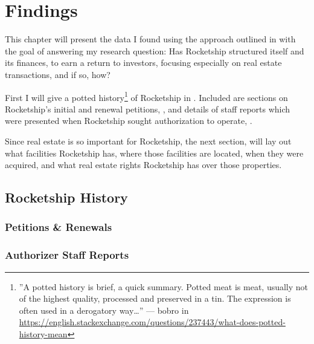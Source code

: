 
\chapter{Findings}\label{ch:findings}\noindent
\bigskip%

This chapter will present the data I found using the approach outlined in  with the goal of answering my research question: Has Rocketship structured itself and its finances, to earn a return to investors, focusing especially on real estate transactions, and if so, how?

First I will give a potted history\footnote{''A potted history is brief, a quick summary. Potted meat is meat, usually not of the highest quality, processed and preserved in a tin. The expression is often used in a derogatory way\ldots'' — bobro in \url{https://english.stackexchange.com/questions/237443/what-does-potted-history-mean}} of Rocketship in . Included are sections on Rocketship's initial and renewal petitions, , and details of staff reports which were presented when Rocketship sought authorization to operate, .

Since real estate is so important for Rocketship, the next section,  will lay out what facilities Rocketship has, where those facilities are located, when they were acquired, and what real estate rights Rocketship has over those properties.

\section{Rocketship History}\label{sec:history}\indent
\subsection{Petitions \& Renewals}\label{sec:petitions-renewals}\indent
\subsection{Authorizer Staff Reports}\label{sec:staff-reports}\indent

